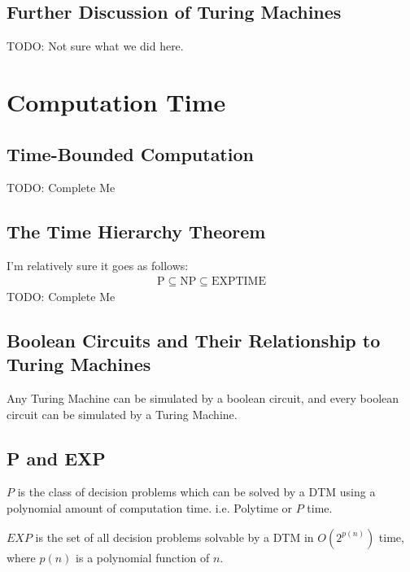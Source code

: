     \section{Further Discussion of Turing Machines}
        TODO: Not sure what we did here.

\chapter{Computation Time}
    \section{Time-Bounded Computation}
        TODO: Complete Me
    \section{The Time Hierarchy Theorem}
        I'm relatively sure it goes as follows:
        \begin{align*}
            \mbox{P} \subseteq \mbox{NP} \subseteq \mbox{EXPTIME}
        \end{align*}
        TODO: Complete Me
    \section{Boolean Circuits and Their Relationship to Turing Machines}
        Any Turing Machine can be simulated by a boolean circuit, and every
        boolean circuit can be simulated by a Turing Machine.
    \section{P and EXP}
        $P$ is the class of decision problems which can be solved by a DTM using
        a polynomial amount of computation time. i.e. Polytime or $P$ time.

        $EXP$ is the set of all decision problems solvable by a DTM in
        $O(2^{p(n)})$ time, where $p(n)$ is a polynomial function of $n$.

